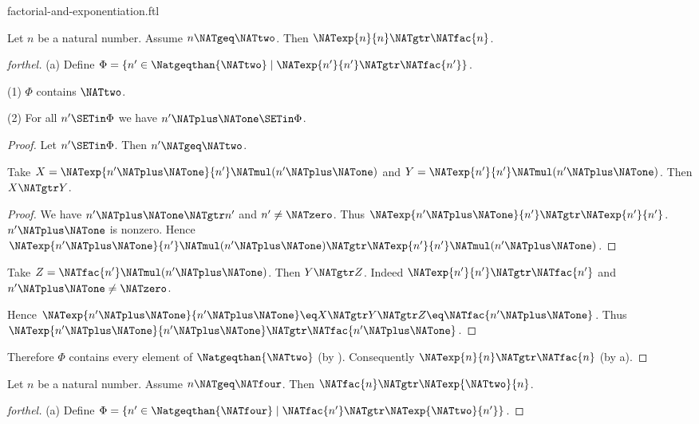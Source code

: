 \documentclass{naproche-library}
\begin{document}
\begin{smodule}[title=Factorial and Exponentiation]{factorial-and-exponentiation.ftl}

\begin{proposition}[forthel,id=ARITHMETIC_12_8113296594960384]
  Let $n$ be a natural number.
  Assume $n \NATgeq \NATtwo$.
  Then $\NATexp{n}{n} \NATgtr \NATfac{n}$.
\end{proposition}
\begin{proof}[forthel]
  (a) Define $\Phi = \{ n' \in \Natgeqthan{\NATtwo} \mid \NATexp{n'}{n'} \NATgtr \NATfac{n'} \}$.

  (1) $\Phi$ contains $\NATtwo$.

  (2) For all $n' \SETin \Phi$ we have $n' \NATplus \NATone \SETin \Phi$.
  \begin{proof}
    Let $n' \SETin \Phi$.
    Then $n' \NATgeq \NATtwo$.

    Take $X = \NATexp{n' \NATplus \NATone}{n'} \NATmul (n' \NATplus \NATone)$ and $Y = \NATexp{n'}{n'} \NATmul (n' \NATplus \NATone)$.
    Then $X \NATgtr Y$.
    \begin{proof}
      We have $n' \NATplus \NATone \NATgtr n'$ and $n' \neq \NATzero$.
      Thus $\NATexp{n' \NATplus \NATone}{n'} \NATgtr \NATexp{n'}{n'}$.
      $n' \NATplus \NATone$ is nonzero.
      Hence $\NATexp{n' \NATplus \NATone}{n'} \NATmul (n' \NATplus \NATone) \NATgtr \NATexp{n'}{n'} \NATmul (n' \NATplus \NATone)$.
    \end{proof}

    Take $Z = \NATfac{n'} \NATmul (n' \NATplus \NATone)$.
    Then $Y \NATgtr Z$.
    Indeed $\NATexp{n'}{n'} \NATgtr \NATfac{n'}$ and $n' \NATplus \NATone \neq \NATzero$.

    Hence $\NATexp{n' \NATplus \NATone}{n' \NATplus \NATone} \eq X \NATgtr Y \NATgtr Z \eq \NATfac{n' \NATplus \NATone}$.
    Thus $\NATexp{n' \NATplus \NATone}{n' \NATplus \NATone} \NATgtr \NATfac{n' \NATplus \NATone}$.
  \end{proof}

  Therefore $\Phi$ contains every element of $\Natgeqthan{\NATtwo}$ (by ).
  Consequently $\NATexp{n}{n} \NATgtr \NATfac{n}$ (by a).
\end{proof}

\begin{proposition}[forthel,id=ARITHMETIC_12_5413271156817920]
  Let $n$ be a natural number.
  Assume $n \NATgeq \NATfour$.
  Then $\NATfac{n} \NATgtr \NATexp{\NATtwo}{n}$.
\end{proposition}
\begin{proof}[forthel]
  (a) Define $\Phi = \{ n' \in \Natgeqthan{\NATfour} \mid \NATfac{n'} \NATgtr \NATexp{\NATtwo}{n'} \}$.


\end{proof}
\end{smodule}
\end{document}
